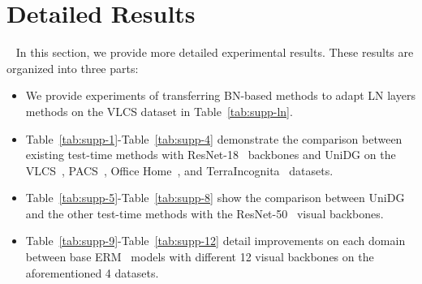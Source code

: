 \documentclass{article} \usepackage{iclr2024_conference,times}
\def\Model{UniDG }
\begin{document}
\section{Detailed Results}~\label{sec:supp:exp}
In this section, we provide more detailed experimental results. These results are organized into three parts: 
\begin{itemize}
        \item We provide experiments of transferring BN-based methods to adapt LN layers methods on the VLCS dataset in Table~\ref{tab:supp-ln}.
	\item Table~\ref{tab:supp-1}-Table~\ref{tab:supp-4} demonstrate the comparison between existing test-time methods with ResNet-18~\cite{he2016deep} backbones and \Model on the VLCS~\cite{li2017deeper}, PACS~\cite{torralba2011unbiased}, Office Home~\cite{venkateswara2017deep}, and TerraIncognita~\cite{beery2018recognition} datasets.
	\item  Table~\ref{tab:supp-5}-Table~\ref{tab:supp-8} show the comparison between \Model and the other test-time methods with the ResNet-50~\cite{he2016deep} visual backbones.
	\item  Table~\ref{tab:supp-9}-Table~\ref{tab:supp-12} detail improvements on each domain between base ERM~\cite{vapnik1998statistical} models with different 12 visual backbones on the aforementioned 4 datasets.
\end{itemize}
\end{document}
